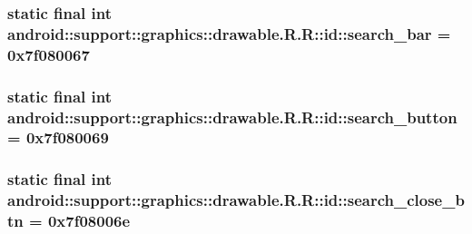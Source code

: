 \hypertarget{classandroid_1_1support_1_1graphics_1_1drawable_1_1_r_1_1id_684554823950e4a9d84aaf7bb0e0aac3}{
\subsubsection[{search\_\-bar}]{\setlength{\rightskip}{0pt plus 5cm}static final int android::support::graphics::drawable.R.R::id::search\_\-bar = 0x7f080067}}
\label{classandroid_1_1support_1_1graphics_1_1drawable_1_1_r_1_1id_684554823950e4a9d84aaf7bb0e0aac3}


\hypertarget{classandroid_1_1support_1_1graphics_1_1drawable_1_1_r_1_1id_366a82b030e74bf7013b809ee3193c44}{
\subsubsection[{search\_\-button}]{\setlength{\rightskip}{0pt plus 5cm}static final int android::support::graphics::drawable.R.R::id::search\_\-button = 0x7f080069}}
\label{classandroid_1_1support_1_1graphics_1_1drawable_1_1_r_1_1id_366a82b030e74bf7013b809ee3193c44}


\hypertarget{classandroid_1_1support_1_1graphics_1_1drawable_1_1_r_1_1id_863b9794f0645c5472c990a657d7a910}{
\subsubsection[{search\_\-close\_\-btn}]{\setlength{\rightskip}{0pt plus 5cm}static final int android::support::graphics::drawable.R.R::id::search\_\-close\_\-btn = 0x7f08006e}}
\label{classandroid_1_1support_1_1graphics_1_1drawable_1_1_r_1_1id_863b9794f0645c5472c990a657d7a910}


